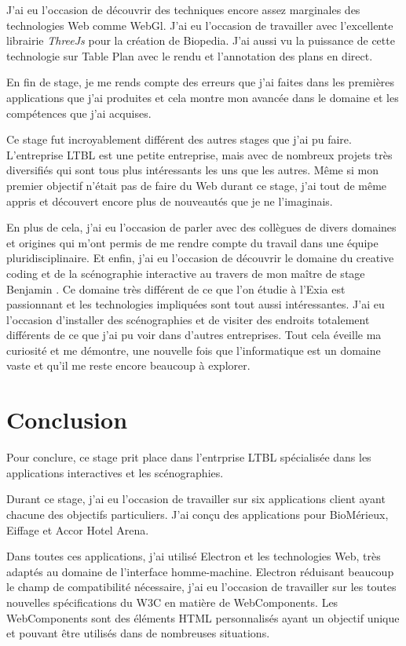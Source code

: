 \documentclass{article}
\begin{document}
    J'ai eu l'occasion de découvrir des techniques encore assez marginales des technologies Web comme WebGl.
    J'ai eu l'occasion de travailler avec l'excellente librairie \emph{ThreeJs} pour la création de Biopedia.
    J'ai aussi vu la puissance de cette technologie sur Table Plan avec le rendu et l'annotation des plans en direct.

    En fin de stage, je me rends compte des erreurs que j'ai faites dans les premières applications que j'ai produites et cela montre mon avancée dans le domaine et les compétences que j'ai acquises.

    Ce stage fut incroyablement différent des autres stages que j'ai pu faire.
    L'entreprise LTBL est une petite entreprise, mais avec de nombreux projets très diversifiés qui sont tous plus intéressants les uns que les autres.
    Même si mon premier objectif n'était pas de faire du Web durant ce stage, j'ai tout de même appris et découvert encore plus de nouveautés que je ne l'imaginais.

    En plus de cela, j'ai eu l'occasion de parler avec des collègues de divers domaines et origines qui m'ont permis de me rendre compte du travail dans une équipe pluridisciplinaire.
    Et enfin, j'ai eu l'occasion de découvrir le domaine du creative coding et de la scénographie interactive au travers de mon maître de stage Benjamin .
    Ce domaine très différent de ce que l'on étudie à l'Exia est passionnant et les technologies impliquées sont tout aussi intéressantes.
    J'ai eu l'occasion d'installer des scénographies et de visiter des endroits totalement différents de ce que j'ai pu voir dans d'autres entreprises.
    Tout cela éveille ma curiosité et me démontre, une nouvelle fois que l'informatique est un domaine vaste et qu'il me reste encore beaucoup à explorer.

    \clearpage

    \section{Conclusion}

    Pour conclure, ce stage prit place dans l'entrprise LTBL spécialisée dans les applications interactives et les scénographies.

    Durant ce stage, j'ai eu l'occasion de travailler sur six applications client ayant chacune des objectifs particuliers.
    J'ai conçu des applications pour BioMérieux, Eiffage et Accor Hotel Arena.

    Dans toutes ces applications, j'ai utilisé Electron et les technologies Web, très adaptés au domaine de l'interface homme-machine.
    Electron réduisant beaucoup le champ de compatibilité nécessaire, j'ai eu l'occasion de travailler sur les toutes nouvelles spécifications du W3C en matière de WebComponents.
    Les WebComponents sont des éléments HTML personnalisés ayant un objectif unique et pouvant être utilisés dans de nombreuses situations.
\end{document}
